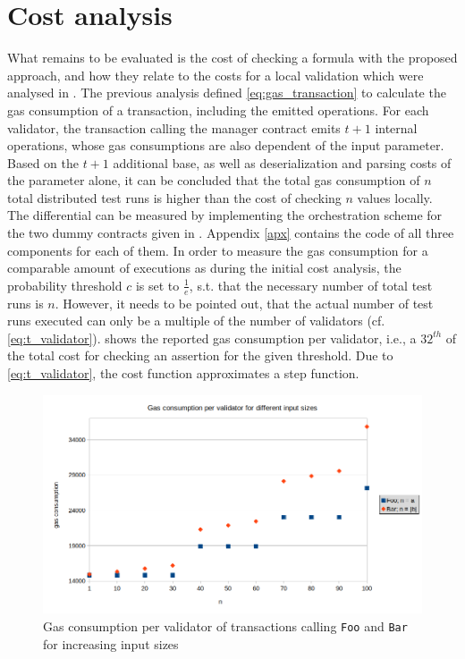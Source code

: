 \section{Cost analysis}\label{sec:cost_analysis_distributed}
What remains to be evaluated is the cost of checking a formula with the proposed approach, and how they relate to the costs for a local validation which were analysed in . The previous analysis defined \eqref{eq:gas_transaction} to calculate the gas consumption of a transaction, including the emitted operations. For each validator, the transaction calling the manager contract emits $t+1$ internal operations, whose gas consumptions are also dependent of the input parameter. Based on the $t+1$ additional base, as well as deserialization and parsing costs of the parameter alone, it can be concluded that the total gas consumption of $n$ total distributed test runs is higher than the cost of checking $n$ values locally. \\
The differential can be measured by implementing the orchestration scheme for the two dummy contracts given in . Appendix \ref{apx} contains the code of all three components for each of them. In order to measure the gas consumption for a comparable amount of executions as during the initial cost analysis, the probability threshold $c$ is set to $\frac{1}{e}$, s.t. that the necessary number of total test runs is $n$. However, it needs to be pointed out, that the actual number of test runs executed can only be a multiple of the number of validators (cf. \eqref{eq:t_validator}).  shows the reported gas consumption per validator, i.e., a $32^{th}$ of the total cost for checking an assertion for the given threshold. Due to \eqref{eq:t_validator}, the cost function approximates a step function.
\begin{figure}[t]
\centering
\includegraphics[width=0.9\linewidth]{figures/4-offline_tezos/cost_analysis}
\caption{Gas consumption per validator of transactions calling \texttt{Foo} and \texttt{Bar} for increasing input sizes}
\label{fig:cost_distributed}
\end{figure}
